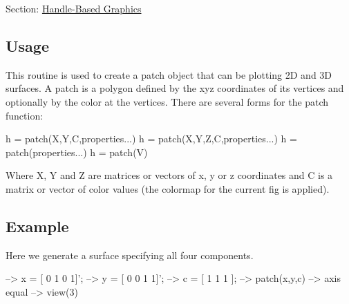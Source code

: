 Section\-: \hyperlink{sec_handle}{Handle-\/\-Based Graphics} \hypertarget{vtkwidgets_vtkxyplotwidget_Usage}{}\subsection{Usage}\label{vtkwidgets_vtkxyplotwidget_Usage}
This routine is used to create a patch object that can be plotting 2\-D and 3\-D surfaces. A patch is a polygon defined by the xyz coordinates of its vertices and optionally by the color at the vertices. There are several forms for the {\ttfamily patch} function\-: \begin{DoxyVerb}  h = patch(X,Y,C,properties...)
  h = patch(X,Y,Z,C,properties...)
  h = patch(properties...)
  h = patch(V)
\end{DoxyVerb}
 Where {\ttfamily X}, {\ttfamily Y} and {\ttfamily Z} are matrices or vectors of {\ttfamily x}, {\ttfamily y} or {\ttfamily z} coordinates and {\ttfamily C} is a matrix or vector of color values (the colormap for the current fig is applied). \hypertarget{variables_struct_Example}{}\subsection{Example}\label{variables_struct_Example}
Here we generate a surface specifying all four components.


\begin{DoxyVerbInclude}
--> x = [ 0 1 0 1]';
--> y = [ 0 0 1 1]';
--> c = [ 1 1 1 ];
--> patch(x,y,c)
--> axis equal
--> view(3)
\end{DoxyVerbInclude}


